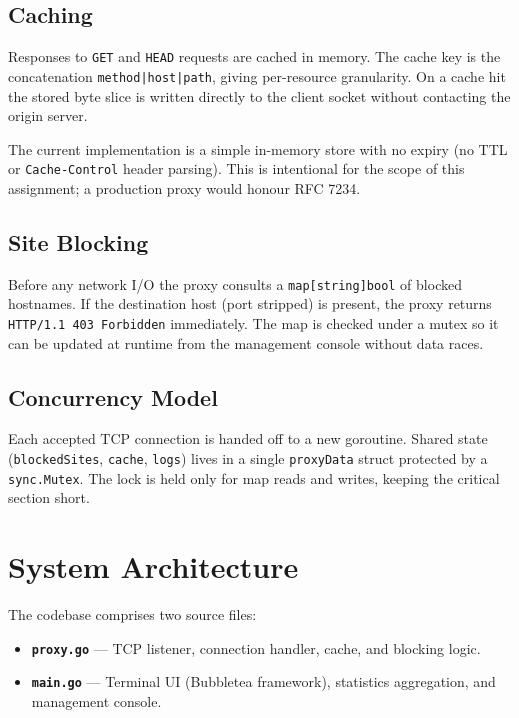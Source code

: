 \documentclass[11pt,a4paper]{article}
\begin{document}
\subsection{Caching}

Responses to \texttt{GET} and \texttt{HEAD} requests are cached in memory.
The cache key is the concatenation \texttt{method|host|path}, giving
per-resource granularity. On a cache hit the stored byte slice is written
directly to the client socket without contacting the origin server.

The current implementation is a simple in-memory store with no expiry (no TTL
or \texttt{Cache-Control} header parsing). This is intentional for the scope
of this assignment; a production proxy would honour RFC 7234.

\subsection{Site Blocking}

Before any network I/O the proxy consults a \texttt{map[string]bool} of blocked
hostnames. If the destination host (port stripped) is present, the proxy returns
\texttt{HTTP/1.1 403 Forbidden} immediately. The map is checked under a mutex so
it can be updated at runtime from the management console without data races.

\subsection{Concurrency Model}

Each accepted TCP connection is handed off to a new goroutine. Shared state
(\texttt{blockedSites}, \texttt{cache}, \texttt{logs}) lives in a single
\texttt{proxyData} struct protected by a \texttt{sync.Mutex}. The lock is held
only for map reads and writes, keeping the critical section short.

\section{System Architecture}

The codebase comprises two source files:

\begin{itemize}
  \item \textbf{\texttt{proxy.go}} --- TCP listener, connection handler, cache,
    and blocking logic.
  \item \textbf{\texttt{main.go}} --- Terminal UI (Bubbletea framework),
    statistics aggregation, and management console.
\end{itemize}
\end{document}
